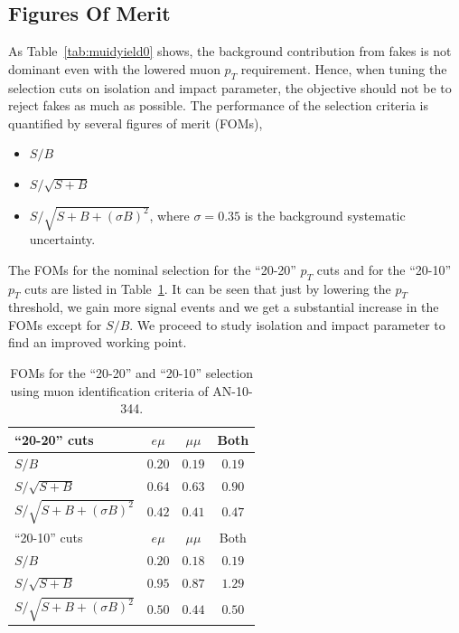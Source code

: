 \subsection{Figures Of Merit}
As Table~\ref{tab:muidyield0} shows, the background contribution from fakes is not dominant even with the lowered muon $p_T$ requirement. Hence, when tuning the selection cuts on isolation and impact parameter, the objective should not be to reject fakes as much as possible. The performance of the selection criteria is quantified by several figures of merit (FOMs), 
\begin{itemize}
\item $S/B$
\item $S/\sqrt{S+B}$
\item $S/\sqrt{S+B+(\sigma B)^2}$, where $\sigma=0.35$ is the background systematic uncertainty.
\end{itemize}
The FOMs for the nominal selection for the ``20-20'' $p_T$ cuts and for the ``20-10'' $p_T$ cuts are listed in Table~\ref{tab:muidfom0}. It can be seen that just by lowering the $p_T$ threshold, we gain more signal events and we get a substantial increase in the FOMs except for $S/B$. We proceed to study isolation and impact parameter to find an improved working point.

\begin{table}[!htbp]
\begin{center}
\begin{tabular}{|l|c|c|c|}
\hline
	``20-20'' cuts & $e\mu$ & $\mu\mu$ & Both \\
\hline
$S/B$                       & $0.20$ & $0.19$ & $0.19$ \\
$S/\sqrt{S+B}$              & $0.64$ & $0.63$ & $0.90$ \\
$S/\sqrt{S+B+(\sigma B)^2}$ & $0.42$ & $0.41$ & $0.47$ \\
\hline\hline
	``20-10'' cuts & $e\mu$ & $\mu\mu$ & Both \\
\hline
$S/B$                       & $0.20$ & $0.18$ & $0.19$ \\
$S/\sqrt{S+B}$              & $0.95$ & $0.87$ & $1.29$ \\
$S/\sqrt{S+B+(\sigma B)^2}$ & $0.50$ & $0.44$ & $0.50$ \\
\hline
\end{tabular}
\caption{FOMs for the ``20-20'' and ``20-10'' selection using muon identification criteria of AN-10-344.}
\label{tab:muidfom0}
\end{center}
\end{table}

